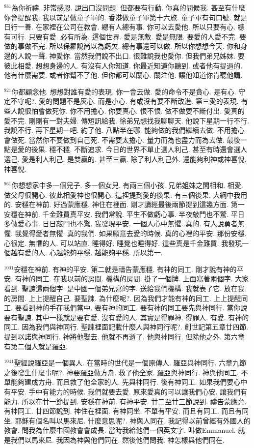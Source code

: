 \documentclass{book}
\begin{document}
$^{881}$為你祈禱.
非常感恩.
說出口沒問題.
但都要有行動.
你真的問候我.
甚至有什麼你會提醒我.
我以前是做童子軍的.
香港做童子軍第十六旅.
童子軍有句口號.
就是日行一善.
在家裡在公司在教會.
總有人總有事.
你可以去愛他.
所以只要有心.
總有可行.
只要有愛.
必有所為.
這個世界.
愛是無敵.
愛是無限.
要愛的人愛不完.
要做的事做不完.
所以保羅說尚以為虧欠.
總有事還可以做.
所以你想想今天.
你和身邊的人說一聲.
神愛你.
當然我們說不出口.
很難說我也愛你.
但我們弟兄姊妹.
要彼此相愛.
想想身邊的人.
有沒有人你知道.
你最近知道你聽到.
或者他有提過的.
他有什麼需要.
或者你幫不了他.
但你都可以關心.
關注他.
讓他知道你肯聽他講.

$^{921}$你都顧念他.
想想對誰有愛的表現.
你一會去做.
愛的命令不是貪心.
是有心.
守定不守呢?.
愛的問題不是灰心.
而是小心.
有或沒有要不斷改進.
第三愛的表現.
有些人說很怕會做死你.
你不用擔心.
你要真心.
恨不恨.
做不做要不斷付出.
愛真的愛不完.
剛剛有一對夫婦.
傳短訊給我.
徐弟兄想找我聊聊天.
他說下星期一行不行.
我說不行.
再下星期一吧.
約了他.
八點半在哪.
能夠做的我們繼續去做.
不用擔心會做死.
當然你不要做到自己死.
不需要太擔心.
量力而為也盡力而為去做.
最後一點是愛的後果.
穩不穩.
不斷追求.
今日的世界不單止選人利己.
甚至有時還會選人選己.
愛是利人利己.
是雙贏的.
甚至三贏.
除了利人利己外.
還能夠利神或神喜悅.
神喜悅.

$^{961}$你想想家中多一個兒子.
多一個女兒.
有兩三個小孩.
兄弟姐妹之間相和.
相愛.
做父母很開心.
彼此相愛神也很開心.
這裡提到愛的後果.
有三個後果.
大綱中我用的.
安穩在神前.
好過蒙應穩.
神住在裡面.
剛才讀經最後兩節提到這幾方面.
第一安穩在神前.
千金難買真平安.
我們常說.
平生不做虧心事.
半夜敲門也不驚.
平日多做愛心事.
日日敲門也不驚.
我發現平安.
一個人心中無懼.
真的.
有人說勇者無懼.
我覺得愛者無懼.
真的我們.
如果願意去愛的時候.
真的心裡的平安.
那份安穩.
心很定.
無懼的人.
可以站直.
睡得好.
睡覺也睡得好.
這些真是千金難買.
我發現一個越有愛的人.
心越能夠平穩.
越能夠平穩.
所以第一.

$^{1001}$安穩在神前.
有神的平安.
第二就是禱告蒙應穩.
有神的同工.
剛才說有神的平安.
有神的同工.
在我以前的房間.
機構的房間.
掛了一個牌.
上面寫著兩個字.
大家看到.
聖諫這兩個字.
是中國一個弟兄寫的字.
送給我們機構.
我就表了它.
放在我的房間.
上上提醒自己.
要聖諫.
為什麼呢?.
因為我們才能有神的同工.
上上提醒同工.
要看到神的手在我們當中.
要有神的同工.
要有神的同工要先與神同行.
當你說要有聖諫.
其中一樣就是要有愛.
沒有愛的人.
其實是得罪神.
得罪人.
有愛.
有神的同工.
因為我們與神同行.
聖諫裡面記載什麼人與神同行呢?.
創世記第五章廿四節.
提到以諾與神同行.
神將他娶去.
他就不再逝了.
他與神同行.
但除他之外.
第六章有第二個人就是羅亞.

$^{1041}$聖經說羅亞是一個異人.
在當時的世代是一個原傳人.
羅亞與神同行.
六章九節之後發生什麼事呢?.
神要羅亞做方舟.
救了他全家.
羅亞與神同行.
神與他同工.
不單能夠建成方舟.
而且救了他全家的人.
先與神同行.
後有神同工.
如果我們要心中有平安.
手中有能力的時候.
我們就要去愛.
原來愛真的可以讓我們心安.
讓我們有能力.
所以在廿一節提到.
安穩在神前.
有神平安.
廿二至廿三節說到.
禱告蒙應允.
有神同工.
廿四節說到.
神住在裡面.
有神同坐.
不單有平安.
而且有同工.
而且有同坐.
耶穌有個名叫以馬來尼.
什麼意思呢?.
神與人同在.
我記得以前曾經有外國人的教會.
問我為什麼中國教會會成長.
當時我給他們一個英文字.
叫做Emmanuel.
就是我們以馬來尼.
我因為神與他們同在.
然後他們問我.
神怎樣與他們同在.
\end{document}

